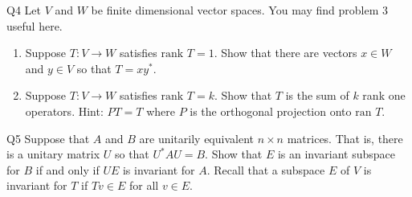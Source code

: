 \documentclass{article}
\begin{document}
\begin{prob}{Q4}
Let $V$ and $W$ be finite dimensional vector spaces. You may find problem 3 useful here.
\begin{enumerate}[label= (\alph*)] 
    \item Suppose $T: V \to W$ satisfies $\text{rank } T = 1$. Show that there are vectors $x \in W$ and $y \in V$ so that $T = xy^*$.
    \item Suppose $T: V \to W$ satisfies $\text{rank } T = k$. Show that $T$ is the sum of $k$ rank one operators. Hint: $PT = T$ where $P$ is the orthogonal projection onto $\text{ran } T$.
\end{enumerate}
\end{prob}

\begin{prob}{Q5}
Suppose that $A$ and $B$ are unitarily equivalent $n \times n$ matrices. That is, there is a unitary matrix $U$ so that $U^*AU = B$. Show that $E$ is an invariant subspace for $B$ if and only if $UE$ is invariant for $A$.
Recall that a subspace $E$ of $V$ is invariant for $T$ if $Tv \in E$ for all $v \in E$.
\end{prob}
\end{document}
